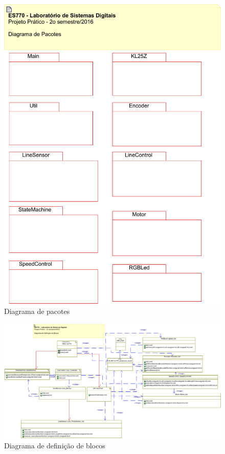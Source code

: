\documentclass{article}
\begin{document}
\begin{figure}[H]
	\centering
	\includegraphics[width=0.9\linewidth]{pacotes}
	\caption{Diagrama de pacotes}
	\label{fig:pacotes}
\end{figure}
\begin{figure}[H]
	\centering
	\includegraphics[width=1.5\linewidth, center]{blocos}
	\caption{Diagrama de definição de blocos}
	\label{fig:blocos}
\end{figure}
\end{document}

